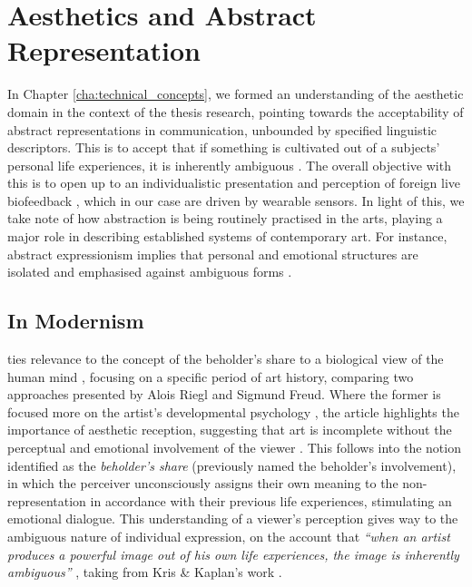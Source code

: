 \section{Aesthetics and Abstract Representation}
\label{lit_review:abstract}

In Chapter \ref{cha:technical_concepts}, we formed an understanding of the aesthetic domain in the context of the thesis research, pointing towards the acceptability of abstract representations in communication, unbounded by specified linguistic descriptors. This is to accept that if something is cultivated out of a subjects' personal life experiences, it is inherently ambiguous \cite{kaplan_esthetic_1948}. The overall objective with this is to open up to an individualistic presentation and perception of foreign live biofeedback \cite{lux_live_2018}, which in our case are driven by wearable sensors. In light of this, we take note of how abstraction is being routinely practised in the arts, playing a major role in describing established systems of contemporary art. For instance, abstract expressionism implies that personal and emotional structures are isolated and emphasised against ambiguous forms \cite{pollock_action_2008}.

\subsection*{In Modernism}

\citeauthor{kandel_two_2013} ties relevance to the concept of the beholder's share to a biological view of the human mind \cite{kandel_two_2013}, focusing on a specific period of art history, comparing two approaches presented by Alois Riegl and Sigmund Freud. Where the former is focused more on the artist's developmental psychology \cite{freud_leonardo_1999}, the article \citeauthor{kandel_two_2013} highlights the importance of aesthetic reception, suggesting that art is incomplete without the perceptual and emotional involvement of the viewer \cite{riegl_group_1999}. This follows into the notion identified as the \textit{beholder's share} (previously named the beholder's involvement), in which the perceiver unconsciously assigns their own meaning to the non-representation in accordance with their previous life experiences, stimulating an emotional dialogue. This understanding of a viewer's perception gives way to the ambiguous nature of individual expression, on the account that \textit{``when an artist produces a powerful image out of his own life experiences, the image is inherently ambiguous''} \cite{kandel_two_2013}, taking from Kris \& Kaplan's work \cite{kaplan_esthetic_1948}.

